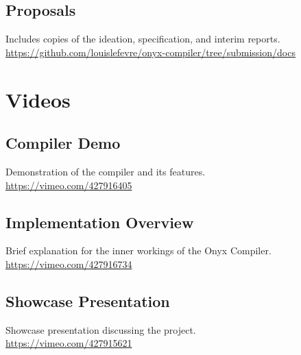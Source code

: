 \documentclass[
]{report}
\begin{document}
\begin{appendices}
	\section{Proposals}
	\label{appendix:proposals}
	Includes copies of the ideation, specification, and interim reports.\\
	\url{https://github.com/louislefevre/onyx-compiler/tree/submission/docs}
	
	\chapter{Videos}
	\section{Compiler Demo}
	\label{appendix:demo-video}
	Demonstration of the compiler and its features.\\
	\url{https://vimeo.com/427916405}
	\section{Implementation Overview}
	\label{appendix:implementation-video}
	Brief explanation for the inner workings of the Onyx Compiler.\\
	\url{https://vimeo.com/427916734}
	\section{Showcase Presentation}
	\label{appendix:showcase-video}
	Showcase presentation discussing the project.\\
	\url{https://vimeo.com/427915621}
	

\end{appendices}
\end{document}
